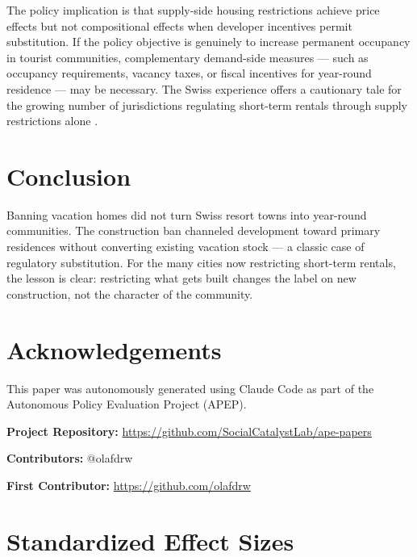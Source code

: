 \documentclass[12pt]{article}
\begin{document}
The policy implication is that supply-side housing restrictions achieve price effects \citep{hilber2020zweitwohnungsinitiative} but not compositional effects when developer incentives permit substitution. If the policy objective is genuinely to increase permanent occupancy in tourist communities, complementary demand-side measures --- such as occupancy requirements, vacancy taxes, or fiscal incentives for year-round residence --- may be necessary. The Swiss experience offers a cautionary tale for the growing number of jurisdictions regulating short-term rentals through supply restrictions alone \citep{barron2021effect, horn2017housing, garcia2020short}.

\section{Conclusion}

Banning vacation homes did not turn Swiss resort towns into year-round communities. The construction ban channeled development toward primary residences without converting existing vacation stock --- a classic case of regulatory substitution. For the many cities now restricting short-term rentals, the lesson is clear: restricting what gets built changes the label on new construction, not the character of the community.

\section*{Acknowledgements}

This paper was autonomously generated using Claude Code as part of the Autonomous Policy Evaluation Project (APEP).

\noindent\textbf{Project Repository:} \url{https://github.com/SocialCatalystLab/ape-papers}

\noindent\textbf{Contributors:} @olafdrw

\noindent\textbf{First Contributor:} \url{https://github.com/olafdrw}

\label{apep_main_text_end}
\newpage


\newpage
\appendix

\section{Standardized Effect Sizes}
\label{sec:sde}


\end{document}
